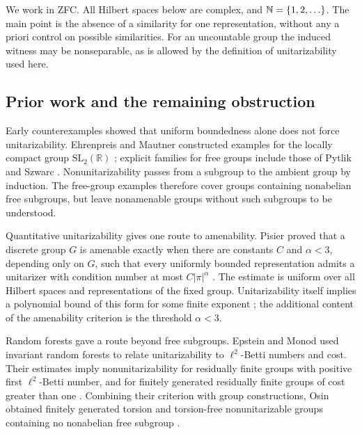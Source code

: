 We work in ZFC. All Hilbert spaces below are complex, and
\(\mathbb N=\{1,2,\ldots\}\). The main point is the absence of a similarity for one
representation, without any a priori control on possible similarities.
For an uncountable group the induced witness may be nonseparable, as is
allowed by the definition of unitarizability used here.

\subsection*{Prior work and the remaining obstruction}

Early counterexamples showed that uniform boundedness alone does not
force unitarizability. Ehrenpreis and Mautner constructed examples for
the locally compact group \(\mathrm{SL}_2(\mathbb R)\) \cite{EhrenpreisMautner1955}; explicit
families for free groups include those of Pytlik and Szwarc
\cite{PytlikSzwarc1986}. Nonunitarizability passes from a subgroup to the
ambient group by induction. The free-group examples therefore cover groups
containing nonabelian free subgroups, but leave nonamenable groups
without such subgroups to be understood.

Quantitative unitarizability gives one route to amenability. Pisier
proved that a discrete group \(G\) is amenable exactly when there are
constants \(C\) and \(\alpha<3\), depending only on \(G\), such that
every uniformly bounded representation admits a unitarizer with
condition number at most \(C|\pi|^\alpha\)
\cite[Theorem~0.1]{Pisier1998}. The estimate is uniform over all Hilbert
spaces and representations of the fixed group. Unitarizability itself
implies a polynomial bound of this form for some finite exponent
\cite[Theorem~4.1]{Pisier2004}; the additional content of the amenability
criterion is the threshold \(\alpha<3\).

Random forests gave a route beyond free subgroups. Epstein and Monod
used invariant random forests to relate unitarizability to
\(\ell^2\)-Betti numbers and cost. Their estimates
imply nonunitarizability for residually finite groups with positive
first \(\ell^2\)-Betti number, and for finitely generated residually
finite groups of cost greater than one
\cite[Theorems~1.1--1.3]{EpsteinMonod2009}. Combining their criterion
with group constructions, Osin obtained finitely generated torsion and
torsion-free nonunitarizable groups containing no nonabelian free
subgroup \cite[Theorems~1.2--1.3]{Osin2009}.

